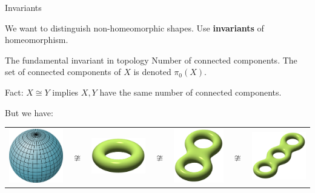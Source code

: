 \documentclass[10pt]{beamer}
\begin{document}
\begin{frame}{Invariants}

We want to distinguish non-homeomorphic shapes. Use \textbf{invariants} of homeomorphism.\pause

\begin{block}{The fundamental invariant in topology}
Number of connected components. The set of connected components of $X$ is denoted $\pi_0(X)$.
\end{block}

Fact: $X\cong Y$ implies $X,Y$ have the same number of connected components.\pause

But we have:

\begin{center}
\begin{tabular}{M{1cm} M{1cm} M{1cm} M{1cm} M{1cm} M{1cm} M{1cm}}
  \includegraphics[scale = 0.15]{pictures/sphere.png} & $\ncong$ & \includegraphics[scale = 1]{pictures/torus.png}
  & $\ncong$ & \includegraphics[scale = 1]{pictures/krendel.png} & $\ncong$ & \includegraphics[scale = 1]{pictures/3krendel.png}
\end{tabular}
\end{center}


\end{frame}
\end{document}
